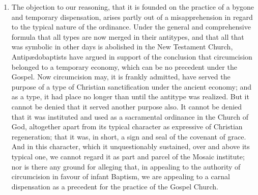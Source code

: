 \documentclass[]{book}
\providecommand{\tightlist}{%
  \setlength{\itemsep}{0pt}\setlength{\parskip}{0pt}}
\begin{document}
\begin{enumerate}
\def\labelenumi{\arabic{enumi}.}
\setcounter{enumi}{1}
\tightlist
\item
  The objection to our reasoning, that it is founded on the practice of a bygone and temporary dispensation, arises partly out of a misapprehension in regard to the typical nature of the ordinance. Under the general and comprehensive formula that all types are now merged in their antitypes, and that all that was symbolic in other days is abolished in the New Testament Church, Antipædobaptists have argued in support of the conclusion that circumcision belonged to a temporary economy, which can be no precedent under the Gospel. Now circumcision may, it is frankly admitted, have served the purpose of a type of Christian sanctification under the ancient economy; and as a type, it had place no longer than until the antitype was realized. But it cannot be denied that it served another purpose also. It cannot be denied that it was instituted and used as a sacramental ordinance in the Church of God, altogether apart from its typical character as expressive of Christian regeneration; that it was, in short, a sign and seal of the covenant of grace. And in this character, which it unquestionably sustained, over and above its typical one, we cannot regard it as part and parcel of the Mosaic institute; nor is there any ground for alleging that, in appealing to the authority of circumcision in favour of infant Baptism, we are appealing to a carnal dispensation as a precedent for the practice of the Gospel Church.
\end{enumerate}
\end{document}
